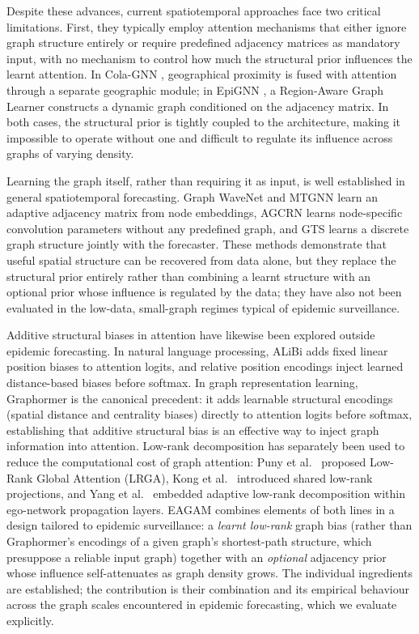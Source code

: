 \documentclass[final,1p,times]{elsarticle}
\begin{document}
Despite these advances, current spatiotemporal approaches face two critical limitations. First, they typically employ attention mechanisms that either ignore graph structure entirely or require predefined adjacency matrices as mandatory input, with no mechanism to control how much the structural prior influences the learnt attention. In Cola-GNN \cite{dengColaGNNCrosslocationAttention2020a}, geographical proximity is fused with attention through a separate geographic module; in EpiGNN \cite{xie2022epignn}, a Region-Aware Graph Learner constructs a dynamic graph conditioned on the adjacency matrix. In both cases, the structural prior is tightly coupled to the architecture, making it impossible to operate without one and difficult to regulate its influence across graphs of varying density.

Learning the graph itself, rather than requiring it as input, is well established in general spatiotemporal forecasting. Graph WaveNet \cite{wu2019graph} and MTGNN \cite{wu2020connecting} learn an adaptive adjacency matrix from node embeddings, AGCRN \cite{bai2020adaptive} learns node-specific convolution parameters without any predefined graph, and GTS \cite{shang2021discrete} learns a discrete graph structure jointly with the forecaster. These methods demonstrate that useful spatial structure can be recovered from data alone, but they replace the structural prior entirely rather than combining a learnt structure with an optional prior whose influence is regulated by the data; they have also not been evaluated in the low-data, small-graph regimes typical of epidemic surveillance.

Additive structural biases in attention have likewise been explored outside epidemic forecasting. In natural language processing, ALiBi \cite{press2022train} adds fixed linear position biases to attention logits, and relative position encodings \cite{shaw2018self} inject learned distance-based biases before softmax. In graph representation learning, Graphormer \cite{ying2021transformers} is the canonical precedent: it adds learnable structural encodings (spatial distance and centrality biases) directly to attention logits before softmax, establishing that additive structural bias is an effective way to inject graph information into attention. Low-rank decomposition has separately been used to reduce the computational cost of graph attention: Puny et al.~\cite{puny2020global} proposed Low-Rank Global Attention (LRGA), Kong et al.~\cite{kong2023low} introduced shared low-rank projections, and Yang et al.~\cite{yang2023self} embedded adaptive low-rank decomposition within ego-network propagation layers. EAGAM combines elements of both lines in a design tailored to epidemic surveillance: a \emph{learnt low-rank} graph bias (rather than Graphormer's encodings of a given graph's shortest-path structure, which presuppose a reliable input graph) together with an \emph{optional} adjacency prior whose influence self-attenuates as graph density grows. The individual ingredients are established; the contribution is their combination and its empirical behaviour across the graph scales encountered in epidemic forecasting, which we evaluate explicitly.
\end{document}

